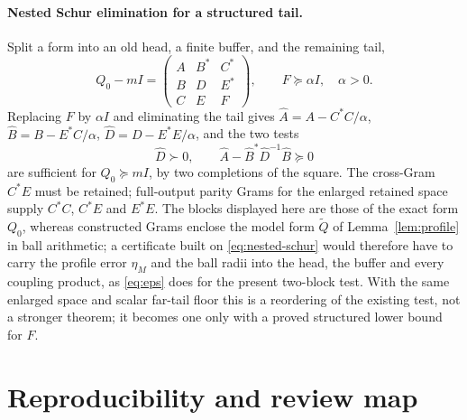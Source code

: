 \documentclass[11pt]{article}
\numberwithin{equation}{section}
\theoremstyle{definition}
\theoremstyle{remark}
\begin{document}
\paragraph{Nested Schur elimination for a structured tail.}
Split a form into an old head, a finite buffer, and the remaining tail,
\[
 Q_0-mI=\begin{pmatrix}
 A&B^*&C^*\\B&D&E^*\\C&E&F
 \end{pmatrix},\qquad F\succeq\alpha I,\quad\alpha>0.
\]
Replacing $F$ by $\alpha I$ and eliminating the tail gives
$\widehat A=A-C^*C/\alpha$, $\widehat B=B-E^*C/\alpha$,
$\widehat D=D-E^*E/\alpha$, and the two tests
\begin{equation}\label{eq:nested-schur}
 \widehat D\succ0,\qquad
 \widehat A-\widehat B^*\widehat D^{-1}\widehat B\succeq0
\end{equation}
are sufficient for $Q_0\succeq mI$, by two completions of the square. The
cross-Gram $C^*E$ must be retained; full-output parity Grams for the enlarged
retained space supply $C^*C$, $C^*E$ and $E^*E$. The blocks displayed here are
those of the exact form $Q_0$, whereas constructed Grams enclose the model
form $\widetilde Q$ of Lemma~\ref{lem:profile} in ball arithmetic; a
certificate built on \eqref{eq:nested-schur} would therefore have to carry the
profile error $\eta_M$ and the ball radii into the head, the buffer and every
coupling product, as \eqref{eq:eps} does for the present two-block test. With
the same enlarged space and scalar far-tail floor this is a reordering of the
existing test, not a stronger theorem; it becomes one only with a proved
structured lower bound for $F$.

\section{Reproducibility and review map}\label{app:reproduce}
\end{document}

